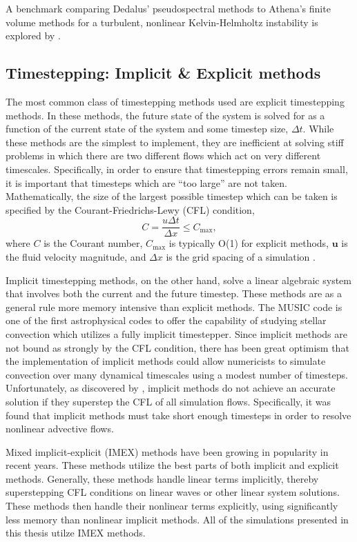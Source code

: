 A benchmark comparing Dedalus' pseudospectral methods to Athena's finite volume methods for a turbulent, nonlinear Kelvin-Helmholtz instability is explored by \citet{Lecoanet_et_al_2016_KH}.


\subsection{Timestepping: Implicit \& Explicit methods}
\label{sct:intro_timestepping}
The most common class of timestepping methods used are explicit timestepping methods.
In these methods, the future state of the system is solved for as a function of the current state of the system and some timestep size, $\Delta t$.
While these methods are the simplest to implement, they are inefficient at solving stiff problems in which there are two different flows which act on very different timescales.
Specifically, in order to ensure that timestepping errors remain small, it is important that timesteps which are ``too large'' are not taken.
Mathematically, the size of the largest possible timestep which can be taken is specified by the Courant-Friedrichs-Lewy (CFL) condition,
\begin{equation}
C = \frac{u \Delta t}{\Delta x} \leq C_{\text{max}},
\end{equation}
where $C$ is the Courant number, $C_{\text{max}}$ is typically O(1) for explicit methods, $\bm{u}$ is the fluid velocity magnitude, and $\Delta x$ is the grid spacing of a simulation \citep{cfl1967}.

Implicit timestepping methods, on the other hand, solve a linear algebraic system that involves both the current and the future timestep.
These methods are as a general rule more memory intensive than explicit methods.
The MUSIC code is one of the first astrophysical codes to offer the capability of studying stellar convection which utilizes a fully implicit timestepper.
Since implicit methods are not bound as strongly by the CFL condition, there has been great optimism that the implementation of implicit methods could allow numericists to simulate convection over many dynamical timescales using a modest number of timesteps.
Unfortunately, as discovered by \citet{viallet&all2011, viallet&all2013, viallet&all2016}, implicit methods do not achieve an accurate solution if they superstep the CFL of all simulation flows.
Specifically, it was found that implicit methods must take short enough timesteps in order to resolve nonlinear advective flows.

Mixed implicit-explicit (IMEX) methods have been growing in popularity in recent years.
These methods utilize the best parts of both implicit and explicit methods.
Generally, these methods handle linear terms implicitly, thereby superstepping CFL conditions on linear waves or other linear system solutions.
These methods then handle their nonlinear terms explicitly, using significantly less memory than nonlinear implicit methods.
All of the simulations presented in this thesis utilze IMEX methods.


